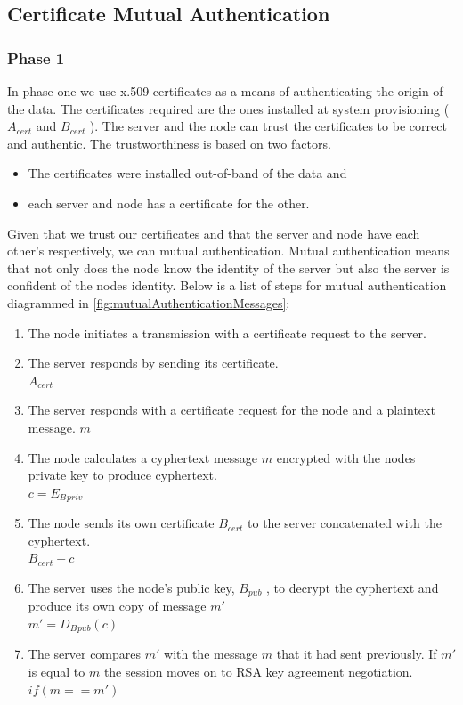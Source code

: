 \subsection{Certificate Mutual Authentication}
\subsubsection{Phase 1}
In phase one we use x.509 certificates as a means of authenticating the origin of the data.
The certificates required are the ones installed at system provisioning ( $A{_{cert}}$ and $B{_{cert}}$ ). 
The server and the node can trust the certificates to be correct and authentic. The trustworthiness is based on two factors. 
\begin{itemize}
\item The certificates were installed out-of-band of the data and 
\item each server and node has a certificate for the other. 
\end{itemize}
Given that we trust our certificates and that the server and node have each other’s respectively, we can mutual authentication. 
Mutual authentication means that not only does the node know the identity of the server but also the server is confident of the nodes identity. 
Below is a list of steps for mutual authentication diagrammed in \autoref{fig:mutualAuthenticationMessages}:

\begin{enumerate}
\item The node initiates a transmission with a certificate request to the server. 
\item The server responds by sending its certificate. \\ $A{_{cert}}$ \par
\item The server responds with a certificate request for the node and a plaintext message. $m$
\item The node calculates a cyphertext message $m$ encrypted with the nodes private key to produce cyphertext. \\
$c=E{_B{_{priv}}}$
\item The node sends its own certificate $B{_{cert}}$  to the server concatenated with the cyphertext.  \\$B{_{cert}} + c$
\item The server uses the node’s public key, $B{_{pub}}$ , to decrypt the cyphertext and produce its own copy of message $m'$\\$m'=D{_B{_{pub}}}(c)$
\item The server compares $m′$ with the message $m$ that it had sent previously. If $m'$ is equal to $m$ the session moves on to RSA key agreement negotiation. \\ $if (m == m')$
\end{enumerate}
 
